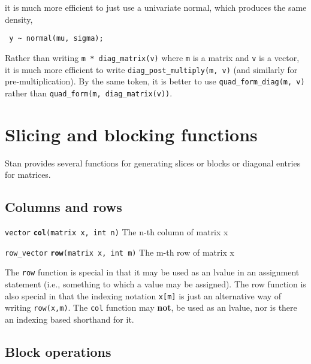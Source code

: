 \documentclass[
  10pt,
]{book}
\begin{document}
it is much more efficient to just use a univariate normal, which
produces the same density,

\begin{verbatim}
 y ~ normal(mu, sigma);
\end{verbatim}

Rather than writing \texttt{m\ *\ diag\_matrix(v)} where \texttt{m} is a matrix and \texttt{v}
is a vector, it is much more efficient to write \texttt{diag\_post\_multiply(m,\ v)} (and similarly for pre-multiplication). By the same token, it is
better to use \texttt{quad\_form\_diag(m,\ v)} rather than \texttt{quad\_form(m,\ diag\_matrix(v))}.

\hypertarget{slicing-and-blocking-functions}{%
\section{Slicing and blocking functions}\label{slicing-and-blocking-functions}}

Stan provides several functions for generating slices or blocks or
diagonal entries for matrices.

\hypertarget{columns-and-rows}{%
\subsection{Columns and rows}\label{columns-and-rows}}


\texttt{vector} \textbf{\texttt{col}}\texttt{(matrix\ x,\ int\ n)}\newline
The n-th column of matrix x


\texttt{row\_vector} \textbf{\texttt{row}}\texttt{(matrix\ x,\ int\ m)}\newline
The m-th row of matrix x

The \texttt{row} function is special in that it may be used as an lvalue in
an assignment statement (i.e., something to which a value may be
assigned). The row function is also special in that the indexing
notation \texttt{x{[}m{]}} is just an alternative way of writing \texttt{row(x,m)}. The
\texttt{col} function may \textbf{not}, be used as an lvalue, nor is there an
indexing based shorthand for it.

\hypertarget{block-operations}{%
\subsection{Block operations}\label{block-operations}}
\end{document}
